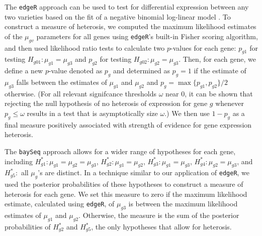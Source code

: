 \documentclass[useAMS,usenatbib,referee]{biom}
\newcommand{\edgeR}{{\tt edgeR}}
\begin{document}
The \edgeR{} approach can be used to test for differential expression between any two varieties based on the fit of a negative binomial log-linear model \citep{robinson2007moderated, robinson2010edgeR}. To construct a measure of heterosis, we computed the maximum likelihood estimates of the $\mu_{gv}$ parameters for all genes using \edgeR{}'s built-in Fisher scoring algorithm, and then used likelihood ratio tests to calculate two $p$-values for each gene: $p_{g1}$  for testing $H_{g01}:\mu_{g1}=\mu_{g3}$ and $p_{g2}$ for testing $H_{g02}:\mu_{g2}=\mu_{g3}$. Then, for each gene, we define a new $p$-value denoted as $p_g$ and determined as $p_g=1$ if the estimate of $\mu_{g3}$ falls between the estimates of $\mu_{g1}$ and $\mu_{g2}$ and $p_g=\max\{p_{g1},p_{g2}\}/2$ otherwise.  (For all relevant signifcance thresholds $\omega$ near 0, it can be shown that rejecting the null hypothesis of no heterosis of expression for gene $g$ whenever $p_g\leq \omega$ results in a test that is asymptotically size $\omega$.)  We then use $1-p_g$ as a final measure positively associated with strength of evidence for gene expression heterosis. 

The {\tt baySeq} approach allows for a wider range of hypotheses for each gene, including $H^*_{g1}: \mu_{g1}=\mu_{g2}=\mu_{g3}$, $H^*_{g 2}: \mu_{g1}=\mu_{g2}$, $H^*_{g 3}: \mu_{g1}=\mu_{g3}$, $H^*_{g 4}: \mu_{g2}=\mu_{g3}$, and $H^*_{g 5}:$ all $\mu_g$'s are distinct. In a technique similar to our application of \edgeR{}, we used the posterior probabilities of these hypotheses to construct a measure of heterosis for each gene. We set this measure to zero if the maximum likelihood estimate, calculated using \edgeR{}, of $\mu_{g3}$ is between the maximum likelihood estimates of $\mu_{g1}$ and $\mu_{g2}$. Otherwise, the measure is the sum of the posterior probabilities of $H^*_{g 2}$ and $H^*_{g 5}$, the only hypotheses that allow for heterosis.
\end{document}
